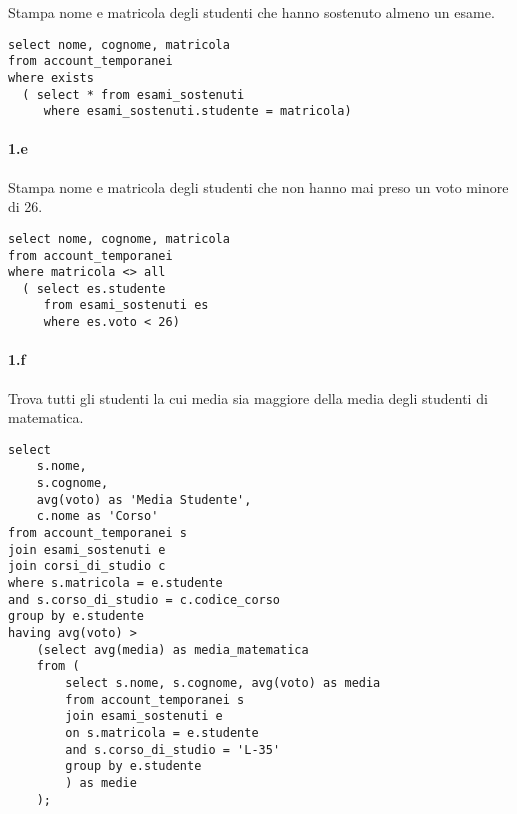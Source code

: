 Stampa nome e matricola degli studenti che hanno sostenuto almeno un esame.

\begin{verbatim}
select nome, cognome, matricola
from account_temporanei
where exists
  ( select * from esami_sostenuti
     where esami_sostenuti.studente = matricola)
\end{verbatim}


\paragraph{1.e}%
\label{par:1.e}

Stampa nome e matricola degli studenti che non hanno mai preso un voto minore di 26.

\begin{verbatim}
select nome, cognome, matricola
from account_temporanei
where matricola <> all
  ( select es.studente
     from esami_sostenuti es
     where es.voto < 26)
\end{verbatim}



\paragraph{1.f}%
\label{par:1.f}

Trova tutti gli studenti la cui media sia maggiore della media degli studenti di matematica.


\begin{verbatim}
select
	s.nome,
	s.cognome,
	avg(voto) as 'Media Studente',
	c.nome as 'Corso'
from account_temporanei s
join esami_sostenuti e
join corsi_di_studio c
where s.matricola = e.studente
and s.corso_di_studio = c.codice_corso
group by e.studente
having avg(voto) >
	(select avg(media) as media_matematica
	from (
		select s.nome, s.cognome, avg(voto) as media
		from account_temporanei s
		join esami_sostenuti e
		on s.matricola = e.studente
		and s.corso_di_studio = 'L-35'
		group by e.studente
		) as medie
	);
\end{verbatim}
